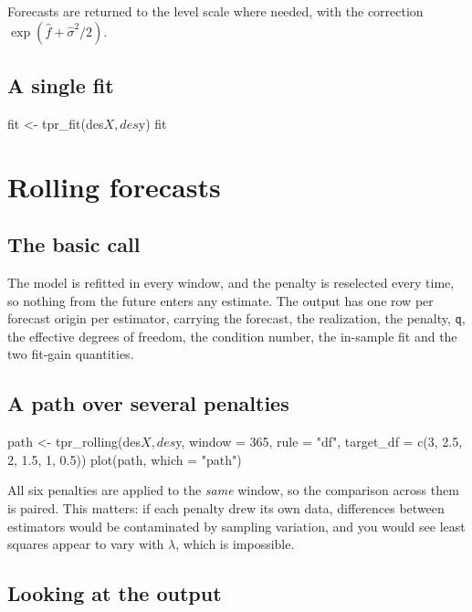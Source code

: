 \documentclass[11pt,a4paper]{report}
\begin{document}
Forecasts are returned to the level scale where needed, with the
correction $\exp(\hat f + \hat\sigma^2/2)$.

\section{A single fit}

\begin{Rblock}
fit <- tpr_fit(des$X, des$y)
fit
\end{Rblock}

\chapter{Rolling forecasts}

\section{The basic call}


The model is refitted in every window, and the penalty is reselected
every time, so nothing from the future enters any estimate. The output
has one row per forecast origin per estimator, carrying the forecast,
the realization, the penalty, \texttt{q}, the effective degrees of
freedom, the condition number, the in-sample fit and the two fit-gain
quantities.

\section{A path over several penalties}

\begin{Rblock}
path <- tpr_rolling(des$X, des$y, window = 365, rule = "df",
                    target_df = c(3, 2.5, 2, 1.5, 1, 0.5))
plot(path, which = "path")
\end{Rblock}

All six penalties are applied to the \emph{same} window, so the
comparison across them is paired. This matters: if each penalty drew its
own data, differences between estimators would be contaminated by
sampling variation, and you would see least squares appear to vary with
$\lambda$, which is impossible.

\section{Looking at the output}
\end{document}

